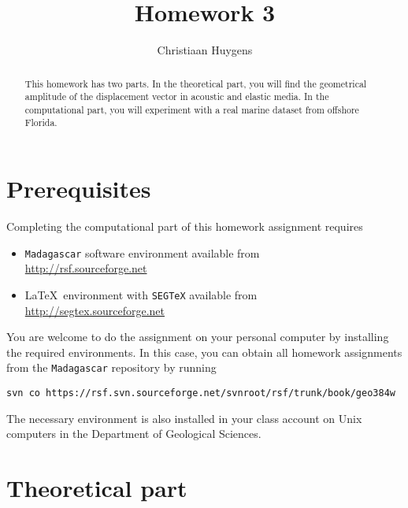 \author{Christiaan Huygens} 
\title{Homework 3}

\begin{abstract}
  This homework has two parts. In the theoretical part, you will find
  the geometrical amplitude of the displacement vector in acoustic and
  elastic media. In the computational part, you will experiment with a
  real marine dataset from offshore Florida.
\end{abstract}

\section{Prerequisites}

Completing the computational part of this homework assignment requires
\begin{itemize}
\item \texttt{Madagascar} software environment available from \\
\url{http://rsf.sourceforge.net}
\item \LaTeX\ environment with \texttt{SEGTeX} available from \\ 
\url{http://segtex.sourceforge.net}
\end{itemize}

You are welcome to do the assignment on your personal computer by
installing the required environments. In this case, you can obtain all
homework assignments from the \texttt{Madagascar} repository by running
\begin{verbatim}
svn co https://rsf.svn.sourceforge.net/svnroot/rsf/trunk/book/geo384w 
\end{verbatim}

The necessary environment is also installed in your class account on
Unix computers in the Department of Geological Sciences.

\section{Theoretical part}

